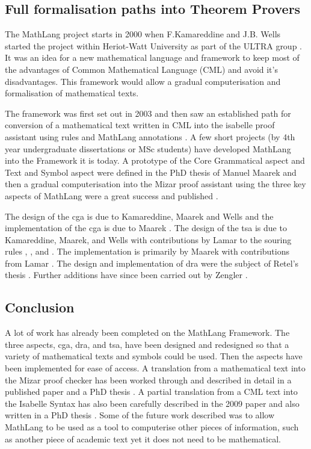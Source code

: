 \subsection{Full formalisation paths into Theorem Provers}

The MathLang project starts in 2000 when F.Kamareddine and J.B. Wells started the project within Heriot-Watt University as part of the ULTRA group \cite{researchprop}. It was an idea for a new mathematical language and framework to keep most of the advantages of Common Mathematical Language (CML) and avoid it's disadvantages. This framework would allow a gradual computerisation and formalisation of mathematical texts.

The framework was first set out in 2003 \cite{firstyear} and then saw an established path for conversion of a mathematical text written in CML into the isabelle proof assistant using rules and MathLang annotations \cite{secondyear}. A few short projects (by 4th year undergraduate dissertations or MSc students) have developed MathLang into the Framework it is today. A prototype of the Core Grammatical aspect and Text and Symbol aspect were defined in the PhD thesis of Manuel Maarek \cite{manuelphd} and then a gradual computerisation into the Mizar proof assistant using the three key aspects of MathLang were a great success and published \cite{mathintomizar}.

The design of the \gls{cga} is due to Kamareddine, Maarek and Wells \cite{oomathlang} and the implementation of the \gls{cga} is due to Maarek \cite{manuelphd}. The design of the \gls{tsa} is due to Kamareddine, Maarek, and Wells with contributions by Lamar to the souring rules \cite{restoringtsa}, \cite{manuelphd}, and \cite{lamarphd}. The implementation is primarily by Maarek \cite{manuelphd} with contributions from Lamar \cite{lamarphd}. The design and implementation of \gls{dra} were the subject of Retel's thesis \cite{krzysztofphd}. Further additions have since been carried out by Zengler \cite{cmtim}.

\subsection{Conclusion}
A lot of work has already been completed on the MathLang Framework. The three aspects, \gls{cga}, \gls{dra}, and \gls{tsa}, have been designed and redesigned so that a variety of mathematical texts and symbols could be used. Then the aspects have been implemented for ease of access. A translation from a mathematical text into the Mizar proof checker has been worked through and described in detail in a published paper \cite{mathintomizar} and a PhD thesis \cite{manuelphd}. A partial translation from a CML text into the Isabelle Syntax has also been carefully described in the 2009 paper \cite{mathintoisa} and also written in a PhD thesis \cite{lamarphd}. Some of the future work described was to allow MathLang to be used as a tool to computerise other pieces of information, such as another piece of academic text yet it does not need to be mathematical.

